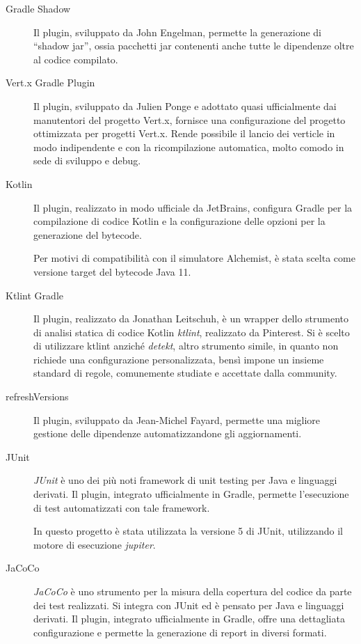      \begin{description}
        \item[Gradle Shadow]
          Il plugin, sviluppato da John Engelman, permette la generazione di ``shadow jar'', ossia pacchetti jar contenenti anche tutte le dipendenze oltre al codice compilato.

        \item[Vert.x Gradle Plugin]
          Il plugin, sviluppato da Julien Ponge e adottato quasi ufficialmente dai manutentori del progetto Vert.x, fornisce una configurazione del progetto ottimizzata per progetti Vert.x.
          Rende possibile il lancio dei verticle in modo indipendente e con la ricompilazione automatica, molto comodo in sede di sviluppo e debug.

        \item[Kotlin]
          Il plugin, realizzato in modo ufficiale da JetBrains, configura Gradle per la compilazione di codice Kotlin e la configurazione delle opzioni per la generazione del bytecode.

          Per motivi di compatibilità con il simulatore Alchemist, è stata scelta come versione target del bytecode Java 11.

        \item[Ktlint Gradle]
          Il plugin, realizzato da Jonathan Leitschuh, è un wrapper dello strumento di analisi statica di codice Kotlin \emph{ktlint}, realizzato da Pinterest.
          Si è scelto di utilizzare ktlint anziché \emph{detekt}, altro strumento simile, in quanto non richiede una configurazione personalizzata, bensì impone un insieme standard di regole, comunemente studiate e accettate dalla community.

        \item[refreshVersions]
          Il plugin, sviluppato da Jean-Michel Fayard, permette una migliore gestione delle dipendenze automatizzandone gli aggiornamenti.

        \item[JUnit]
          \emph{JUnit} è uno dei più noti framework di unit testing per Java e linguaggi derivati.
          Il plugin, integrato ufficialmente in Gradle, permette l'esecuzione di test automatizzati con tale framework.

          In questo progetto è stata utilizzata la versione 5 di JUnit, utilizzando il motore di esecuzione \emph{jupiter}.
        \item[JaCoCo]
          \emph{JaCoCo} è uno strumento per la misura della copertura del codice da parte dei test realizzati.
          Si integra con JUnit ed è pensato per Java e linguaggi derivati.
          Il plugin, integrato ufficialmente in Gradle, offre una dettagliata configurazione e permette la generazione di report in diversi formati.
      \end{description}

